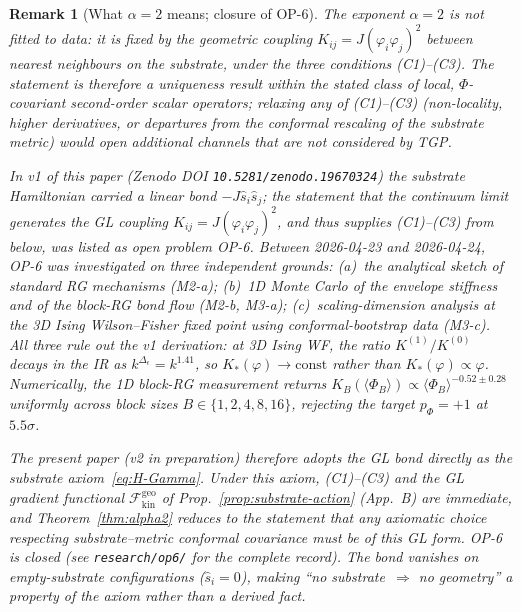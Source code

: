 \documentclass[11pt,a4paper]{article}
\renewcommand{\Phi}{\varPhi}
\newtheorem{remark}[axiom]{Remark}
\begin{document}
\begin{remark}[What $\alpha=2$ means; closure of OP-6]\label{rem:alpha2-closure}
The exponent $\alpha=2$ is \emph{not} fitted to data: it is fixed by the
geometric coupling $K_{ij}=J(\varphi_{i}\varphi_{j})^{2}$ between nearest
neighbours on the substrate, under the three conditions (C1)--(C3). The
statement is therefore a uniqueness result \emph{within} the stated
class of local, $\Phi$-covariant second-order scalar operators; relaxing
any of (C1)--(C3) (non-locality, higher derivatives, or departures from
the conformal rescaling of the substrate metric) would open additional
channels that are not considered by TGP.

In v1 of this paper (Zenodo DOI \texttt{10.5281/zenodo.19670324}) the
substrate Hamiltonian carried a linear bond $-J\hat{s}_{i}\hat{s}_{j}$;
the statement that the continuum limit generates the GL coupling
$K_{ij}=J(\varphi_{i}\varphi_{j})^{2}$, and thus supplies (C1)--(C3)
from below, was listed as open problem OP-6. Between 2026-04-23 and
2026-04-24, OP-6 was investigated on three independent grounds:
(a)~the analytical sketch of standard RG mechanisms (M2-a); (b)~1D
Monte Carlo of the envelope stiffness and of the block-RG bond flow
(M2-b, M3-a); (c)~scaling-dimension analysis at the 3D Ising
Wilson--Fisher fixed point using conformal-bootstrap data (M3-c). All
three rule out the v1 derivation: at 3D Ising WF, the ratio
$K^{(1)}/K^{(0)}$ decays in the IR as $k^{\Delta_{\epsilon}}=k^{1.41}$,
so $K_{*}(\varphi)\to\mathrm{const}$ rather than $K_{*}(\varphi)
\propto\varphi$. Numerically, the 1D block-RG measurement returns
$K_{B}(\langle\Phi_{B}\rangle)\propto\langle\Phi_{B}\rangle^{-0.52\pm0.28}$
uniformly across block sizes $B\in\{1,2,4,8,16\}$, rejecting the
target $p_{\Phi}=+1$ at $5.5\sigma$.

The present paper (v2 in preparation) therefore adopts the GL bond
directly as the substrate axiom~\eqref{eq:H-Gamma}. Under this axiom,
(C1)--(C3) and the GL gradient functional $\mathcal{F}_{\mathrm{kin}}^{\mathrm{geo}}$
of Prop.~\ref{prop:substrate-action} (App.~B) are \emph{immediate},
and Theorem~\ref{thm:alpha2} reduces to the statement that any
axiomatic choice respecting substrate--metric conformal covariance
must be of this GL form. OP-6 is closed (see
\texttt{research/op6/} for the complete record). The bond
vanishes on empty-substrate configurations ($\hat{s}_{i}=0$),
making ``no substrate~$\Rightarrow$ no geometry'' a property of the
axiom rather than a derived fact.
\end{remark}
\end{document}
